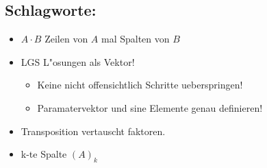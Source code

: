 \documentclass[11pt]{article}
\begin{document}
\subsection{Schlagworte:}
\label{sec:orgcf8c685}
\begin{itemize}
\item \(A\cdot B\) Zeilen von \(A\) mal Spalten von \(B\)
\item LGS L"osungen als Vektor!
\begin{itemize}
\item Keine nicht offensichtlich Schritte ueberspringen!
\item Paramatervektor und sine Elemente genau definieren!
\end{itemize}
\item Transposition vertauscht faktoren.
\item k-te Spalte \((A)_k\)
\end{itemize}
\end{document}

